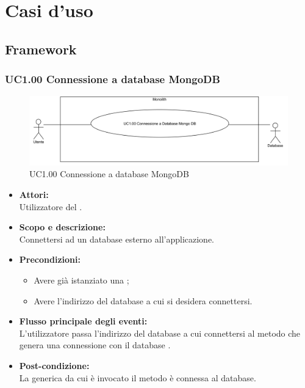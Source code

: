 \section{Casi d'uso}

\subsection{Framework}

\subsubsection{UC1.00 Connessione a database MongoDB} \label{UC1.00}

\begin{figure}[H]
	\centering
	\includegraphics[width=15cm]{../../documenti/AnalisiDeiRequisiti/Diagrammi_img/uc1_00.png}
	\caption{UC1.00 Connessione a database MongoDB}
\end{figure}

\begin{itemize}
\item \textbf{Attori:}
\\Utilizzatore del .
\item \textbf{Scopo e descrizione:} 
\\Connettersi ad un database  esterno all'applicazione.
\item \textbf{Precondizioni:}
	\begin{itemize}
		\item Avere già istanziato una ;
		\item Avere l'indirizzo del database  a cui si desidera connettersi.
	\end{itemize}
\item \textbf{Flusso principale degli eventi:}
\\L'utilizzatore passa l'indirizzo del database a cui connettersi al metodo che genera una connessione con il database .
\item \textbf{Post-condizione:}
\\La {} generica da cui è invocato il metodo è connessa al database.
\end{itemize}

